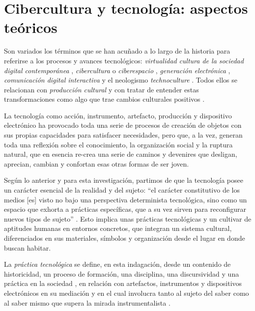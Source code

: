 \documentclass[spanish]{textolivre}
\begin{document}
\section{Cibercultura y tecnología: aspectos teóricos}\label{sec-cibercultura}
Son variados los términos que se han acuñado a lo largo de la historia para referirse a los procesos y avances tecnológicos: \textit{virtualidad} \cite{levy_que_1998} \textit{cultura de la sociedad digital contemporánea} \cite{levy_educacion_1997}, \textit{cibercultura} o \textit{ciberespacio} \cite{levy_cibercultura._2007}, \textit{generación electrónica} \cite{buckingham_mas_2007}, \textit{comunicación digital interactiva} \cite{scolari_hipermediaciones._2008} y el neologismo \textit{technoculture} \cite{penley__1991}. Todos ellos se relacionan con \textit{producción cultural} \cite{baldessar_piel_2011} y con tratar de entender estas transformaciones como algo que trae cambios culturales positivos \cite{castells_sociedad_2006, eco_internet_2012, kerckhove_piel_1999, levy_cibercultura._2007}.

La tecnología como acción, instrumento, artefacto, producción y dispositivo electrónico ha provocado toda una serie de procesos de creación de objetos con sus propias capacidades para satisfacer necesidades, pero que, a la vez, generan toda una reflexión sobre el conocimiento, la organización social \cite{mejia_educaciones_2011a} y la ruptura natural, que en esencia re-crea una serie de caminos y devenires que desligan, aprecian, cambian y confortan esas otras formas de ser joven. 

Según lo anterior y para esta investigación, partimos de que la tecnología posee un carácter esencial de la realidad y del sujeto: “el carácter constitutivo de los medios [es] visto no bajo una perspectiva determinista tecnológica, sino como un espacio que exhorta a prácticas específicas, que a su vez sirven para reconfigurar nuevos tipos de sujeto” \cite[p. 4]{poster_whats_2001}. Esto implica unas prácticas tecnológicas y un cultivar de aptitudes humanas en entornos concretos, que integran un sistema cultural, diferenciados en sus materiales, símbolos y organización \cite{levy_cibercultura._2007} desde el lugar en donde buscan habitar.

La \textit{práctica tecnológica} se define, en esta indagación, desde un contenido de historicidad, un proceso de formación, una disciplina, una discursividad y una práctica en la sociedad \cite{zuluaga_garces_pedagogie_1999}, en relación con artefactos, instrumentos y dispositivos electrónicos en su mediación y en el cual involucra tanto al sujeto del saber como al saber mismo que supera la mirada instrumentalista \cite{mejia_tecnologi_2004, rios_beltran_practica_2018}.
\end{document}
